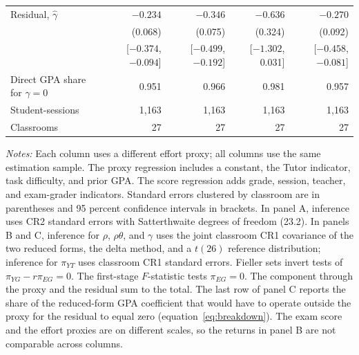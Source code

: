 \begin{table}[htbp]
{\begin{tabular}{lrrrr}
Residual, $\hat\gamma$ & $-0.234$ & $-0.346$ & $-0.636$ & $-0.270$ \\
 & (0.068) & (0.075) & (0.324) & (0.092) \\
 & [$-0.374$, $-0.094$] & [$-0.499$, $-0.192$] & [$-1.302$, 0.031] & [$-0.458$, $-0.081$] \\
Direct GPA share for $\gamma=0$ & 0.951 & 0.966 & 0.981 & 0.957 \\
\midrule
Student-sessions & 1,163 & 1,163 & 1,163 & 1,163 \\
Classrooms & 27 & 27 & 27 & 27 \\
\bottomrule
\end{tabular}}
\par\medskip
\begin{minipage}{\linewidth}
\footnotesize
\textit{Notes:} Each column uses a different effort proxy; all columns use the same estimation sample. The proxy regression includes a constant, the Tutor indicator, task difficulty, and prior GPA. The score regression adds grade, session, teacher, and exam-grader indicators. Standard errors clustered by classroom are in parentheses and 95 percent confidence intervals in brackets. In panel A, inference uses CR2 standard errors with Satterthwaite degrees of freedom (23.2). In panels B and C, inference for $\rho$, $\rho\theta$, and $\gamma$ uses the joint classroom CR1 covariance of the two reduced forms, the delta method, and a $t(26)$ reference distribution; inference for $\pi_{YT}$ uses classroom CR1 standard errors. Fieller sets invert tests of $\pi_{YG}-r\pi_{EG}=0$. The first-stage $F$-statistic tests $\pi_{EG}=0$. The component through the proxy and the residual sum to the total. The last row of panel C reports the share of the reduced-form GPA coefficient that would have to operate outside the proxy for the residual to equal zero (equation~\ref{eq:breakdown}). The exam score and the effort proxies are on different scales, so the returns in panel B are not comparable across columns.
\end{minipage}
\endgroup
\end{table}
